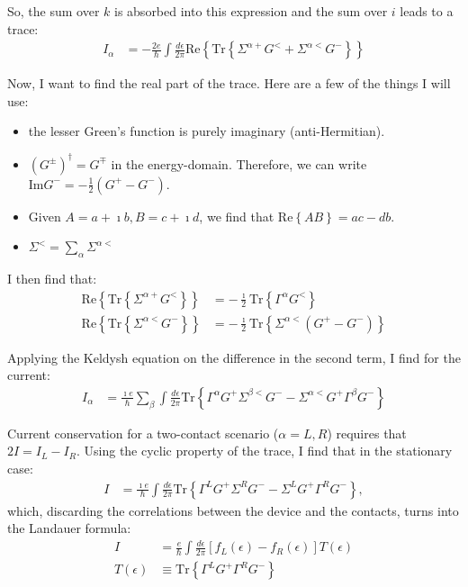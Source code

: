 So, the sum over $k$ is absorbed into this expression and the sum over $i$ leads to a trace:
\begin{align*}
I_\alpha &= -\frac{2e}{\hbar} \int \frac{d\epsilon}{2\pi} \text{Re} \left\{ \text{Tr} \left \{ \Sigma^{\alpha+} G^< + \Sigma^{\alpha <} G^-\right\}\right\}
\end{align*}

Now, I want to find the real part of the trace. Here are a few of the things I will use:
\begin{itemize}
\item the lesser Green's function is purely imaginary (anti-Hermitian). 
\item $(G^\pm)^\dagger = G^\mp$ in the energy-domain. Therefore, we can write $\text{Im} G^- = - \frac{1}{2} \left( G^+ - G^- \right)$.
\item Given $A=a+\imath b, B = c + \imath d$, we find that $\text{Re}\left\{ AB \right\} = ac - db$.
\item $\Sigma^< = \sum_\alpha \Sigma^{\alpha<}$
\end{itemize}

I then find that:
\begin{align*}
\text{Re}\left\{\text{Tr}\left\{ \Sigma^{\alpha+} G^<\right\}\right\} &= - \frac{\imath}{2} \text{Tr}\left\{ \Gamma^\alpha G^< \right\} \\
\text{Re}\left\{\text{Tr}\left\{ \Sigma^{\alpha<} G^-\right\}\right\} &= - \frac{\imath}{2} \text{Tr}\left\{\Sigma^{\alpha<} \left(G^+ - G^-\right)\right\}
\end{align*}

Applying the Keldysh equation on the difference in the second term, I find for the current:
\begin{align*}
I_\alpha &= \frac{\imath e}{\hbar} \sum_\beta \int \frac{d\epsilon}{2\pi} \text{Tr}\left\{ \Gamma^\alpha G^+ \Sigma^{\beta <}G^- - \Sigma^{\alpha<}G^+\Gamma^\beta G^- \right\}
\end{align*}

Current conservation for a two-contact scenario ($\alpha=L,R$) requires that $2 I = I_L - I_R$. Using the cyclic property of the trace, I find that in the stationary case:
\begin{align*}
I &= \frac{\imath e}{\hbar} \int \frac{d\epsilon}{2\pi} \text{Tr}\left\{ \Gamma^L G^+ \Sigma^R G^- - \Sigma^L G^+ \Gamma^R G^-\right\},
\end{align*}
which, discarding the correlations between the device and the contacts, turns into the Landauer formula:
\begin{align}
I &= \frac{e}{\hbar} \int \frac{d\epsilon}{2\pi} \left[ f_L(\epsilon) - f_R(\epsilon)\right] T(\epsilon) \label{eq:landauer}\\
T(\epsilon)&\equiv \text{Tr}\left\{ \Gamma^L G^+ \Gamma^R G^-\right\}\nonumber
\end{align}

